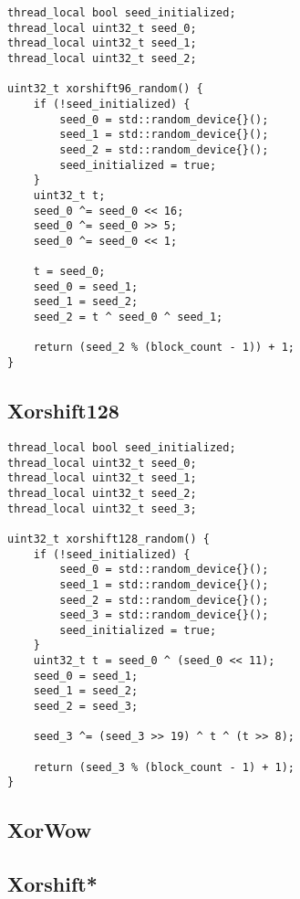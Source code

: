 \begin{@empty}
	\lstset{
		language = [ISO]C++,
		style = basic
	}
	\begin{lstlisting}
thread_local bool seed_initialized;
thread_local uint32_t seed_0;
thread_local uint32_t seed_1;
thread_local uint32_t seed_2;

uint32_t xorshift96_random() {
	if (!seed_initialized) {
		seed_0 = std::random_device{}();
		seed_1 = std::random_device{}();
		seed_2 = std::random_device{}();
		seed_initialized = true;
	}
	uint32_t t;
	seed_0 ^= seed_0 << 16;
	seed_0 ^= seed_0 >> 5;
	seed_0 ^= seed_0 << 1;

	t = seed_0;
	seed_0 = seed_1;
	seed_1 = seed_2;
	seed_2 = t ^ seed_0 ^ seed_1;

	return (seed_2 % (block_count - 1)) + 1;
}
	\end{lstlisting}
\end{@empty}

\subsection[Xorshift128]{Xorshift128} \label{subsec:xorshift128}

\begin{@empty}
	\lstset{
		language = [ISO]C++,
		style = basic
	}
	\begin{lstlisting}
thread_local bool seed_initialized;
thread_local uint32_t seed_0;
thread_local uint32_t seed_1;
thread_local uint32_t seed_2;
thread_local uint32_t seed_3;

uint32_t xorshift128_random() {
	if (!seed_initialized) {
		seed_0 = std::random_device{}();
		seed_1 = std::random_device{}();
		seed_2 = std::random_device{}();
		seed_3 = std::random_device{}();
		seed_initialized = true;
	}
	uint32_t t = seed_0 ^ (seed_0 << 11);
	seed_0 = seed_1;
	seed_1 = seed_2;
	seed_2 = seed_3;

	seed_3 ^= (seed_3 >> 19) ^ t ^ (t >> 8);

	return (seed_3 % (block_count - 1) + 1);
}
	\end{lstlisting}
\end{@empty}

\subsection[XorWow]{XorWow} \label{subsec:xorwow}

	

\subsection[Xorshift*]{Xorshift*} \label{subsec:xorshift*}

